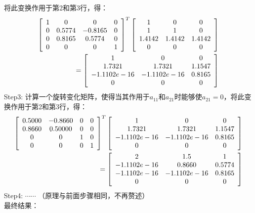 \documentclass[UTF8]{ctexart}
\begin{document}
将此变换作用于第2和第3行，得：
\begin{align}
	\left[\begin{array}{cccc}
	1 & 0 & 0 & 0 \\
	0 & 0.5774 & -0.8165 & 0 \\
	0 & 0.8165 & 0.5774 & 0 \\
	0 & 0 & 0 & 1 
	\end{array}\right]^{T}
	\left[\begin{array}{ccc}
	1 & 0 & 0 \\
	1 & 1 & 0 \\
	1.4142 & 1.4142 & 1.4142 \\
	0 & 0 & 0
	\end{array}\right] \notag\\
	=
	\left[\begin{array}{ccc}
	1 & 0 & 0 \\
	1.7321 & 1.7321 & 1.1547 \\
	-1.1102e-16 & -1.1102e-16 & 0.8165 \\
	0 & 0 & 0
	\end{array}\right] \notag
\end{align}
Step3: 计算一个旋转变化矩阵，使得当其作用于$a_{11}$和$a_{21}$时能够使$a_{21}=0$，将此变换作用于第2和第3行，得：
\begin{align}
\left[\begin{array}{cccc}
0.5000 & -0.8660 & 0 & 0 \\
0.8660 & 0.50000 & 0 & 0 \\
0 & 0 & 1 & 0 \\
0 & 0 & 0 & 1 
\end{array}\right]^{T}
\left[\begin{array}{ccc}
1 & 0 & 0 \\
1.7321 & 1.7321 & 1.1547 \\
-1.1102e-16 & -1.1102e-16 & 0.8165 \\
0 & 0 & 0
\end{array}\right] \notag\\
=
\left[\begin{array}{ccc}
2 & 1.5 & 1 \\
-1.1102e-16 & 0.8660 & 0.5774 \\
-1.1102e-16 & -1.1102e-16 & 0.8165 \\
0 & 0 & 0
\end{array}\right] \notag
\end{align}
Step4: $\cdots \cdots$ （原理与前面步骤相同，不再赘述）\\
最终结果：
\end{document}
